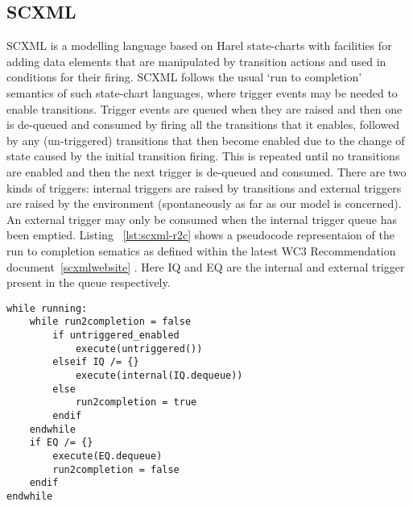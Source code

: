 

\subsection{SCXML}
\label{sec:scxml}

SCXML is a modelling language based on Harel state-charts with facilities for adding data elements that are manipulated by transition actions and used in conditions for their firing. SCXML follows the usual `run to completion' semantics of such state-chart languages, where trigger events may be needed to enable transitions. Trigger events are queued when they are raised and then one is de-queued and consumed by firing all the transitions that it enables, followed by any (un-triggered) transitions that then become enabled due to the change of state caused by the initial transition firing. This is repeated until no transitions are enabled and then the next trigger is de-queued and consumed. There are two kinds of triggers: internal triggers are raised by transitions and external triggers are raised by the environment (spontaneously as far as our model is concerned). An external trigger may only be consumed when the internal trigger queue has been emptied. Listing ~\cref{lst:scxml-r2c} shows a pseudocode representaion of the run to completion sematics as defined within the latest WC3 Recommendation document~\ref{scxmlwebsite} . Here IQ and EQ are the internal and external trigger present in the queue respectively. 

\begin{lstlisting}[caption=Pseudocode for 'run to completion',label={lst:scxml-r2c}]
while running:
	while run2completion = false
		if untriggered_enabled
			execute(untriggered())
		elseif IQ /= {}
			execute(internal(IQ.dequeue)) 
		else
			run2completion = true
		endif
	endwhile
	if EQ /= {}
		execute(EQ.dequeue) 
		run2completion = false
	endif
endwhile 
\end{lstlisting}


